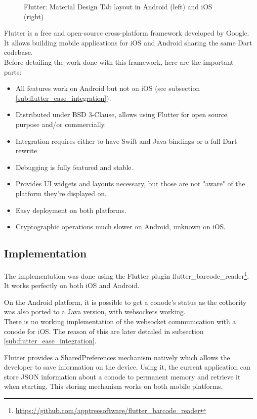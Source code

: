 \documentclass[11pt, a4paper, twoside, openright]{article} %
\begin{document}
{\begin{figure}[!htb]
	\caption{Flutter: Material Design Tab layout in Android (left) and iOS (right)}
	\label{fig:flutter_material_design}
\end{figure}

Flutter is a free and open-source cross-platform framework developed by Google. It allows building mobile applications for iOS and Android sharing the same Dart codebase.\\

Before detailing the work done with this framework, here are the important parts:

\begin{itemize}
	\item All features work on Android but not on iOS (see subsection \ref{sub:flutter_ease_integration}).
	\item Distributed under BSD 3-Clause, allows using Flutter for open source purpose and/or commercially.
	\item Integration requires either to have Swift and Java bindings or a full Dart rewrite
	\item Debugging is fully featured and stable.
	\item Provides UI widgets and layouts necessary, but those are not "aware" of the platform they're displayed on.
	\item Easy deployment on both platforms.
	\item Cryptographic operations much slower on Android, unknown on iOS.
\end{itemize}


\subsection{Implementation}
The implementation was done using the Flutter plugin flutter\_barcode\_reader\footnote{\url{https://github.com/apptreesoftware/flutter_barcode_reader}}. It works perfectly on both iOS and Android.

On the Android platform, it is possible to get a conode's status as the cothority was also ported to a Java version, with websockets working.\\
There is no working implementation of the websocket communication with a conode for iOS. The reason of this are later detailed in subsection \ref{sub:flutter_ease_integration}.

Flutter provides a SharedPreferences mechanism natively which allows the developer to save information on the device. Using it, the current application can store JSON information about a conode to permanent memory and retrieve it when starting. This storing mechanism works on both mobile platforms.

}
\end{document}
